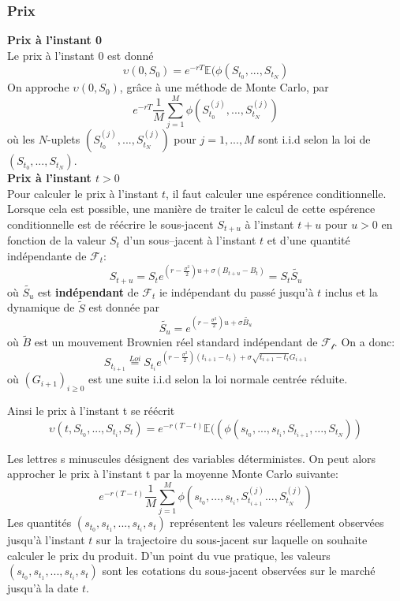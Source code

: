 \documentclass[french,12pt,a4paper]{article}
\begin{document}
\subsubsection{Prix}
\textbf{Prix à l'instant 0}\\
Le prix à l'instant 0 est donné
$$ \upsilon(0, S_{0}) = e^{-rT}\mathbb{E}(\phi(S_{t_{0}},...,S_{t_{N}})$$
On approche $\upsilon(0, S_{0})$, grâce à une méthode de Monte Carlo, par
$$ e^{-rT}\frac{1}{M}\sum_{j=1}^{M} \phi(S_{t_{0}}^{(j)},...,S_{t_{N}}^{(j)})$$
où les $N$-uplets $(S_{t_{0}}^{(j)},...,S_{t_{N}}^{(j)})$ pour $j=1,...,M$ sont i.i.d selon la loi de $(S_{t_{0}},...,S_{t_{N}})$.\\

\textbf{Prix à l'instant $t>0$}\\
Pour calculer le prix à l'instant $t$, il faut calculer une espérence conditionnelle. Lorsque cela est possible, une manière de traiter le calcul de cette espérence conditionnelle est de réécrire le sous-jacent $S_{t+u}$ à l'instant $t+u$ pour $u>0$ en fonction de la valeur $S_{t}$ d’un sous–jacent à l’instant $t$ et d’une quantité indépendante de $\mathcal{F}_{t}$:
$$ S_{t+u} = S_{t}e^{(r-\frac{\sigma^{2}}{2})u+\sigma(B_{t+u}-B_{t})} = S_{t}\tilde{S_{u}}$$
où $\tilde{S_{u}}$ est \textbf{indépendant} de $\mathcal{F}_{t}$ ie indépendant du passé jusqu'à $t$ inclus et la dynamique de $\tilde{S}$ est donnée par
$$ \tilde{S_{u}} = e^{(r-\frac{\sigma^{2}}{2})u+\sigma\tilde{B_{u}}}$$
où $\tilde{B}$ est un mouvement Brownien réel standard indépendant de $\mathcal{F_{t}}$. On a donc:
$$ S_{t_{i+1}} \stackrel{Loi}{=} S_{t_{i}}e^{(r-\frac{\sigma^{2}}{2})(t_{i+1}-t_{i})+\sigma\sqrt{t_{i+1}-t_{i}}G_{i+1}} $$
où $(G_{i+1})_{i\geq0}$ est une suite i.i.d selon la loi normale centrée réduite.

Ainsi le prix à l’instant t se réécrit
$$\upsilon(t, S_{t_{0}},..., S_{t_{i}},S_{t}) = e^{-r(T-t)}\mathbb{E}((\phi(s_{t_{0}},...,s_{t_{i}},S_{t_{i+1}},...,S_{t_{N}}))$$

Les lettres s minuscules désignent des variables déterministes. On peut alors approcher le prix
à l’instant t par la moyenne Monte Carlo suivante:
$$ e^{-r(T-t)}\frac{1}{M}\sum_{j=1}^{M} \phi(s_{t_{0}},...,s_{t_{i}},S_{t_{i+1}}^{(j)}...,S_{t_{N}}^{(j)})$$
Les quantités $(s_{t_{0}},s_{t_{1}},...,s_{t_{i}},s_{t})$ représentent les valeurs réellement observées jusqu’à l’instant $t$ sur la trajectoire du sous-jacent sur laquelle on souhaite calculer le prix du produit. D’un point du vue pratique, les valeurs $(s_{t_{0}},s_{t_{1}},...,s_{t_{i}},s_{t})$ sont les cotations du sous-jacent observées sur le marché jusqu’à la date $t$.
\end{document}
